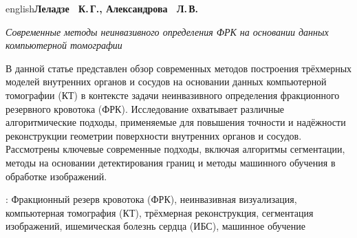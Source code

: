 \par \begin {otherlanguage*}{english}\makeatletter \textbf {Леладзе ~К.\unhbox \voidb@x \nobreak \,Г.\unskip {}, \ignorespaces Александрова ~Л.\unhbox \voidb@x \nobreak \,В.}\makeatother \par \textit {Современные методы неинвазивного определения ФРК на основании данных компьютерной томографии}\par В данной статье представлен обзор современных методов построения трёхмерных моделей внутренних органов и сосудов на основании данных компьютерной томографии (КТ) в контексте задачи неинвазивного определения фракционного резервного кровотока (ФРК). Исследование охватывает различные алгоритмические подходы, применяемые для повышения точности и надёжности реконструкции геометрии поверхности внутренних органов и сосудов. Рассмотрены ключевые современные подходы, включая алгоритмы сегментации, методы на основании детектирования границ и методы машинного обучения в обработке изображений. \par \keywordsname : Фракционный резерв кровотока (ФРК), неинвазивная визуализация, компьютерная томография (КТ), трёхмерная реконструкция, сегментация изображений, ишемическая болезнь сердца (ИБС), машинное обучение \par \end {otherlanguage*}\par \vspace \bigskipamount 
